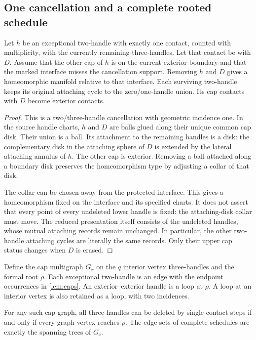 \subsection{One cancellation and a complete rooted schedule}

\begin{lemma}
\label{lem:relative-move}
Let $h$ be an exceptional two-handle with exactly one contact, counted with
multiplicity, with the currently remaining three-handles. Let that contact
be with $D$. Assume that the other cap of $h$ is on the current exterior
boundary and that the marked interface misses the cancellation support.
Removing $h$ and $D$ gives a homeomorphic manifold relative to that
interface. Each surviving two-handle keeps its original attaching cycle to
the zero/one-handle union. Its cap contacts with $D$ become exterior contacts.
\end{lemma}

\begin{proof}
This is a two/three-handle cancellation with geometric incidence one. In
the source handle charts, $h$ and $D$ are balls glued along their unique
common cap disk. Their union is a ball. Its attachment to the remaining
handles is a disk: the complementary disk in the attaching sphere of $D$
is extended by the lateral attaching annulus of $h$. The other cap is
exterior. Removing a ball attached along a boundary disk preserves the
homeomorphism type by adjusting a collar of that disk.

The collar can be chosen away from the protected interface. This gives a
homeomorphism fixed on the interface and its specified charts. It does not
assert that every point of every undeleted lower handle is fixed: the
attaching-disk collar must move. The reduced presentation itself consists
of the undeleted handles, whose mutual attaching records remain unchanged.
In particular, the other two-handle attaching cycles are literally the
same records. Only their upper cap status changes when $D$ is erased.
\end{proof}

Define the cap multigraph $G_x$ on the $q$ interior vertex three-handles and
the formal root $\rho$. Each exceptional two-handle is an edge with the
endpoint occurrences in \cref{lem:caps}. An exterior--exterior handle is a
loop at $\rho$. A loop at an interior vertex is also retained as a loop,
with two incidences.

\begin{lemma}
\label{lem:rooted}
For any such cap graph, all three-handles can be deleted by single-contact
steps if and only if every graph vertex reaches $\rho$. The edge sets of
complete schedules are exactly the spanning trees of $G_x$.
\end{lemma}

